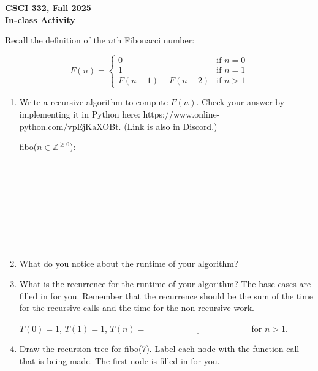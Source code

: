 \documentclass[11pt]{article}
\begin{document}
\begin{center}
\Large\textbf{CSCI 332, Fall 2025}%
\\
\LARGE\textbf{In-class Activity}%
\end{center}

Recall the definition of the $n$th Fibonacci number:

\begin{equation*}
   F(n) = \begin{cases}
      0 & \text{if } n = 0 \\
      1 & \text{if } n = 1 \\
      F(n-1) + F(n-2) & \text{if } n > 1
   \end{cases}
\end{equation*}

\begin{enumerate}
   \item Write a recursive algorithm to compute $F(n)$. Check your answer
   by implementing it in Python here: https://www.online-python.com/vpEjKaXOBt.
   (Link is also in Discord.)

       \begin{algo}
    fibo($n \in \mathbb{Z}^{\geq 0}$):\+\\
    \\
    \\
    \\
    \\
    \\
    \\
    \\
    \\
    \hspace{4in}

    \end{algo}

    \item What do you notice about the runtime of your algorithm?

    \item What is the recurrence for the runtime of your algorithm? The base
    cases are filled in for you.  Remember that the recurrence should be the sum
    of the time for the recursive calls and the time for the non-recursive work.

    $T(0) = 1$, $T(1) = 1$, $T(n) = \underline{\hspace{5cm}}$ for $n > 1$.


   \item Draw the recursion tree for fibo(7). Label each node with the function call
   that is being made. The first node is filled in for you.


\end{enumerate}
\end{document}
